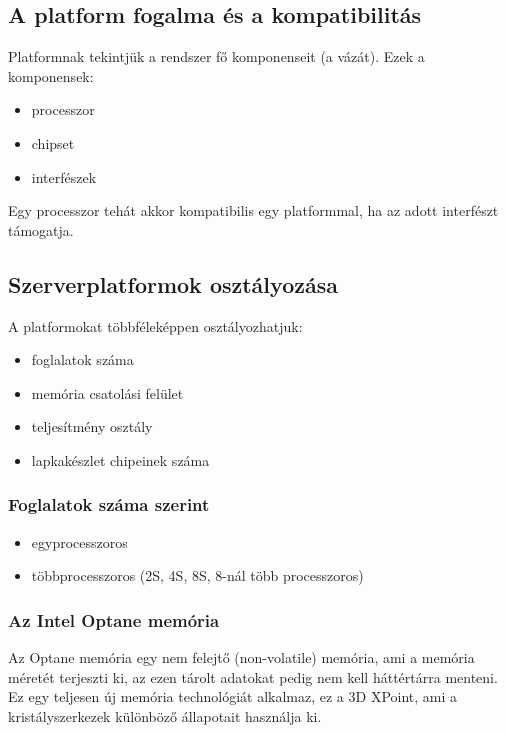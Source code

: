 \subsection{A platform fogalma és a kompatibilitás}
Platformnak tekintjük a rendszer fő komponenseit (a vázát).
Ezek a komponensek:
\begin{itemize}
    \item processzor
    \item chipset
    \item interfészek
\end{itemize}

Egy processzor tehát akkor kompatibilis egy platformmal, ha az adott interfészt támogatja.

\subsection{Szerverplatformok osztályozása}
A platformokat többféleképpen osztályozhatjuk:
\begin{itemize}
    \item foglalatok száma
    \item memória csatolási felület
    \item teljesítmény osztály
    \item lapkakészlet chipeinek száma
\end{itemize}

\subsubsection{Foglalatok száma szerint}
\begin{itemize}
    \item egyprocesszoros
    \item többprocesszoros (2S, 4S, 8S, 8-nál több processzoros)
\end{itemize}

\subsubsection{Az Intel Optane memória}
Az Optane memória egy nem felejtő (non-volatile) memória, ami a memória méretét terjeszti ki, az ezen tárolt adatokat pedig nem kell háttértárra menteni.
Ez egy teljesen új memória technológiát alkalmaz, ez a 3D XPoint, ami a kristályszerkezek különböző állapotait használja ki.

